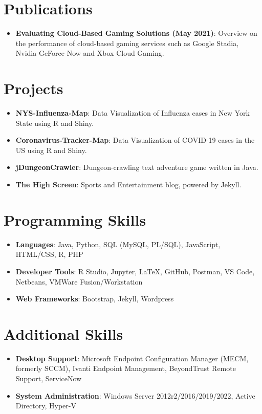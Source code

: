 \documentclass[letterpaper,11pt]{article}
\newcommand{\resumeItem}[2]{
  \item\small{
    \textbf{#1}{: #2 \vspace{-2pt}}
  }
}
\newcommand{\resumeSubItem}[2]{\resumeItem{#1}{#2}\vspace{-4pt}}
\newcommand{\resumeSubHeadingListStart}{\begin{itemize}[leftmargin=*]}
\newcommand{\resumeSubHeadingListEnd}{\end{itemize}}
\begin{document}
\section{Publications}
  	\resumeSubHeadingListStart
    	\resumeSubItem{Evaluating Cloud-Based Gaming Solutions (May 2021)}{Overview on the performance of cloud-based gaming services such as Google Stadia, Nvidia GeForce Now and Xbox Cloud Gaming.}
	\resumeSubHeadingListEnd

\section{Projects}
  	\resumeSubHeadingListStart
   		\resumeSubItem{NYS-Influenza-Map}{Data Visualization of Influenza cases in New York State using R and Shiny.}
    	\resumeSubItem{Coronavirus-Tracker-Map}{Data Visualization of COVID-19 cases in the US using R and Shiny.}
   		\resumeSubItem{jDungeonCrawler}{Dungeon-crawling text adventure game written in Java.}
    	\resumeSubItem{The High Screen}{Sports and Entertainment blog, powered by Jekyll.}
  	\resumeSubHeadingListEnd

\section{Programming Skills}
  	\resumeSubHeadingListStart
    	\resumeSubItem{Languages}{Java, Python, SQL (MySQL, PL/SQL), JavaScript, HTML/CSS, R, PHP} 
   		\resumeSubItem{Developer Tools}{R Studio, Jupyter, LaTeX, GitHub, Postman, VS Code, Netbeans, VMWare Fusion/Workstation}
    	\resumeSubItem{Web Frameworks}{Bootstrap,  Jekyll, Wordpress} 
  	\resumeSubHeadingListEnd

\section{Additional Skills}
  	\resumeSubHeadingListStart
    	\resumeSubItem{Desktop Support}{Microsoft Endpoint Configuration Manager (MECM, formerly SCCM), Ivanti Endpoint Management, BeyondTrust Remote Support, ServiceNow}
   		\resumeSubItem{System Administration}{Windows Server 2012r2/2016/2019/2022, Active Directory, Hyper-V}
  	\resumeSubHeadingListEnd

\end{document}
